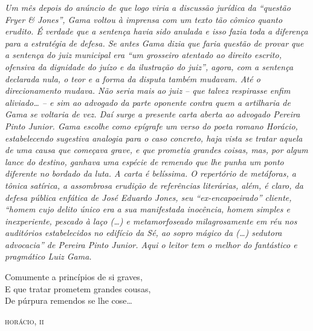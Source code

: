 \begin{didascalia}
\emph{Um mês depois do anúncio de que logo viria a discussão jurídica da
``questão Fryer \& Jones'', Gama voltou à imprensa com um texto tão cômico
quanto erudito. É verdade que a sentença havia sido anulada e isso fazia
toda a diferença para a estratégia de defesa. Se antes Gama dizia que
faria questão de provar que a sentença do juiz municipal era ``um
grosseiro atentado ao direito escrito, ofensiva da dignidade do juízo e
da ilustração do juiz'', agora, com a sentença declarada nula, o teor e a
forma da disputa também mudavam. Até o direcionamento mudava. Não seria
mais ao juiz -- que talvez respirasse enfim aliviado\ldots{} -- e sim ao
advogado da parte oponente contra quem a artilharia de Gama se voltaria
de vez. Daí surge a presente carta aberta ao advogado Pereira Pinto
Junior. Gama escolhe como epígrafe um verso do poeta romano Horácio,
estabelecendo sugestiva analogia para o caso concreto, haja vista se
tratar aquela de uma causa que começava grave, e que prometia grandes
coisas, mas, por algum lance do destino, ganhava uma espécie de remendo
que lhe punha um ponto diferente no bordado da luta. A carta é
belíssima. O repertório de metáforas, a tônica satírica, a assombrosa
erudição de referências literárias, além, é claro, da defesa pública
enfática de José Eduardo Jones, seu ``ex-encapoeirado'' cliente, ``homem
cujo delito único era a sua manifestada inocência, homem simples e
inexperiente, pescado à laço (\ldots{}) e metamorfoseado milagrosamente em
réu nos auditórios estabelecidos no edifício da Sé, ao sopro mágico da
(\ldots{}) sedutora advocacia'' de Pereira Pinto Junior. Aqui o leitor tem o
melhor do fantástico e pragmático Luiz Gama.}
\end{didascalia}

\epigraph{Comumente a princípios de si graves,\\
E que tratar prometem grandes cousas,\\
De púrpura remendos se lhe cose\footnotemark\ldots{}}{\textsc{horácio, ii}\footnotemark}



